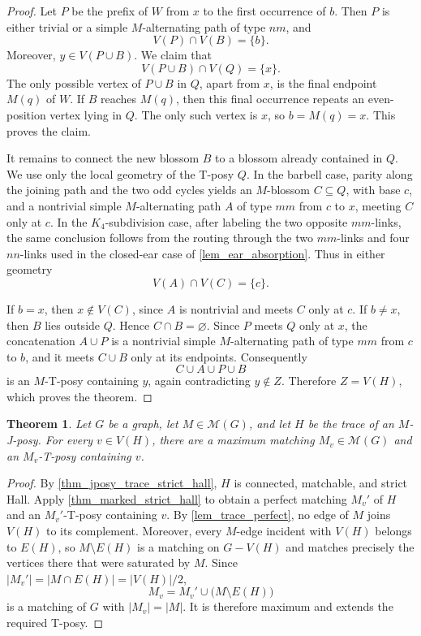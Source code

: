 \documentclass[preprint,12pt]{elsarticle}
\theoremstyle{plain}
\newtheorem{theorem}{Theorem}[section]
\begin{document}
\begin{proof}
Let \(P\) be the prefix of \(W\) from \(x\) to the first occurrence of
\(b\). Then \(P\) is either trivial or a simple \(M\)-alternating path of
type \(nm\), and
\[
V(P)\cap V(B)=\{b\}.
\]
Moreover, \(y\in V(P\cup B)\). We claim that
\[
V(P\cup B)\cap V(Q)=\{x\}.
\]
The only possible vertex of \(P\cup B\) in \(Q\), apart from \(x\), is
the final endpoint \(M(q)\) of \(W\). If \(B\) reaches \(M(q)\), then
this final occurrence repeats an even-position vertex lying in \(Q\). The
only such vertex is \(x\), so \(b=M(q)=x\). This proves the claim.

It remains to connect the new blossom \(B\) to a blossom already contained
in \(Q\). We use only the local geometry of the T-posy \(Q\). In the
barbell case, parity along the joining path and the two odd cycles yields an
\(M\)-blossom \(C\subseteq Q\), with base \(c\), and a nontrivial simple
\(M\)-alternating path \(A\) of type \(mm\) from \(c\) to \(x\), meeting
\(C\) only at \(c\). In the \(K_4\)-subdivision case, after labeling the
two opposite \(mm\)-links, the same conclusion follows from the routing
through the two \(mm\)-links and four \(nn\)-links used in the closed-ear
case of \cref{lem_ear_absorption}. Thus in either geometry
\[
V(A)\cap V(C)=\{c\}.
\]

If \(b=x\), then \(x\notin V(C)\), since \(A\) is nontrivial and meets
\(C\) only at \(c\). If \(b\neq x\), then \(B\) lies outside \(Q\).
Hence \(C\cap B=\varnothing\). Since \(P\) meets \(Q\) only at \(x\),
the concatenation \(A\cup P\) is a nontrivial simple
\(M\)-alternating path of type \(mm\) from \(c\) to \(b\), and it meets
\(C\cup B\) only at its endpoints. Consequently
\[
C\cup A\cup P\cup B
\]
is an \(M\)-T-posy containing \(y\), again contradicting \(y\notin Z\).
Therefore \(Z=V(H)\), which proves the theorem.
\end{proof}

\begin{theorem}\label{thm_marked_jposy}
Let \(G\) be a graph, let \(M\in\mathcal M(G)\), and let \(H\) be the trace
of an \(M\)-J-posy.  For every \(v\in V(H)\), there are a maximum matching
\(M_v\in\mathcal M(G)\) and an \(M_v\)-T-posy containing \(v\).
\end{theorem}

\begin{proof}
By \cref{thm_jposy_trace_strict_hall}, \(H\) is connected, matchable, and strict Hall.
Apply \cref{thm_marked_strict_hall} to obtain a perfect matching \(M_v'\) of
\(H\) and an \(M_v'\)-T-posy containing \(v\).  By
\cref{lem_trace_perfect}, no edge of \(M\) joins \(V(H)\) to its complement.
Moreover, every \(M\)-edge incident with \(V(H)\) belongs to \(E(H)\), so
\(M\setminus E(H)\) is a matching on \(G-V(H)\) and matches precisely the
vertices there that were saturated by \(M\).  Since
\(|M_v'|=|M\cap E(H)|=|V(H)|/2\),
\[
M_v=M_v'\cup\bigl(M\setminus E(H)\bigr)
\]
is a matching of \(G\) with \(|M_v|=|M|\).  It is therefore maximum and
extends the required T-posy.
\end{proof}
\end{document}

